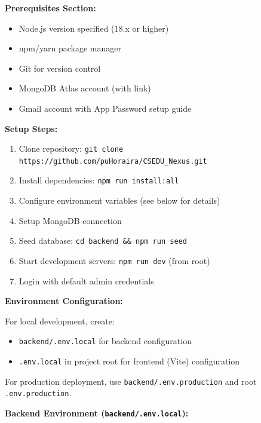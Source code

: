 \documentclass[12pt,a4paper]{article}
\begin{document}
\textbf{Prerequisites Section:}
\begin{itemize}[noitemsep]
  \item Node.js version specified (18.x or higher)
  \item npm/yarn package manager
  \item Git for version control
  \item MongoDB Atlas account (with link)
  \item Gmail account with App Password setup guide
\end{itemize}

\textbf{Setup Steps:}
\begin{enumerate}[noitemsep]
  \item Clone repository: \texttt{git clone https://github.com/puHoraira/CSEDU\_Nexus.git}
  \item Install dependencies: \texttt{npm run install:all}
  \item Configure environment variables (see below for details)
  \item Setup MongoDB connection
  \item Seed database: \texttt{cd backend \&\& npm run seed}
  \item Start development servers: \texttt{npm run dev} (from root)
  \item Login with default admin credentials
\end{enumerate}

\textbf{Environment Configuration:}

For local development, create:
\begin{itemize}[noitemsep]
  \item \texttt{backend/.env.local} for backend configuration
  \item \texttt{.env.local} in project root for frontend (Vite) configuration
\end{itemize}

For production deployment, use \texttt{backend/.env.production} and root \texttt{.env.production}.

\textbf{Backend Environment (\texttt{backend/.env.local}):}
\end{document}
